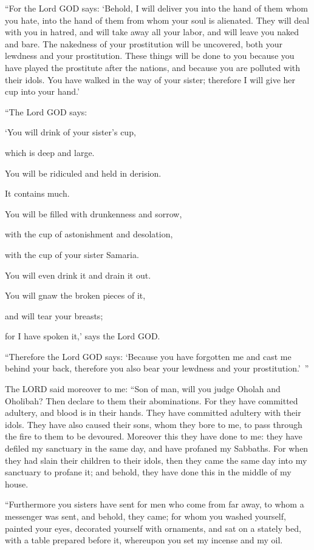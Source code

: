 \myverse{}“For the Lord GOD says: ‘Behold, I will deliver you into the
hand of them whom you hate, into the hand of them from whom your soul is alienated.
\myverse{}They will deal with you in hatred, and will take away all your labor, and
will leave you naked and bare. The nakedness of your prostitution will be uncovered, both your lewdness
and your prostitution.
\myverse{}These things will be done to you because you have played the prostitute after
the nations, and because you are polluted with their idols.
\myverse{}You have walked in the way of your sister; therefore I will give her cup
into your hand.’

\myverse{}“The Lord GOD says:

‘You will drink of your sister’s cup,

which is deep and large.

You will be ridiculed and held in derision.

It contains much.

\myverse{}You will be filled with drunkenness and sorrow,

with the cup of astonishment and desolation,

with the cup of your sister Samaria.

\myverse{}You will even drink it and drain it out.

You will gnaw the broken pieces of it,

and will tear your breasts;

for I have spoken it,’ says the Lord GOD.

\myverse{}“Therefore the Lord GOD says: ‘Because you have forgotten me
and cast me behind your back, therefore you also bear your lewdness and your prostitution.’ ”

\myverse{}The LORD said moreover to me: “Son of man, will you judge Oholah
and Oholibah? Then declare to them their abominations.
\myverse{}For they have committed adultery, and blood is in their hands. They have
committed adultery with their idols. They have also caused their sons, whom they bore to me, to pass through
the fire to them to be devoured.
\myverse{}Moreover this they have done to me: they have defiled my sanctuary in the
same day, and have profaned my Sabbaths.
\myverse{}For when they had slain their children to their idols, then they came the
same day into my sanctuary to profane it; and behold, they have done this in the middle of my house.

\myverse{}“Furthermore you sisters have sent for men who come from far
away, to whom a messenger was sent, and behold, they came; for whom you washed yourself, painted your
eyes, decorated yourself with ornaments,
\myverse{}and sat on a stately bed, with a table prepared before it, whereupon you
set my incense and my oil.

